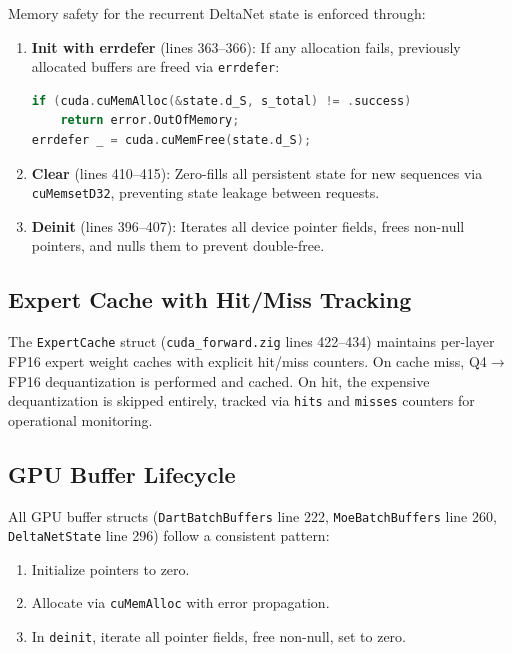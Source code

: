 \documentclass[11pt]{article}
\begin{document}
Memory safety for the recurrent DeltaNet state is enforced through:

\begin{enumerate}
  \item \textbf{Init with errdefer} (lines 363--366): If any allocation fails,
        previously allocated buffers are freed via \texttt{errdefer}:
\begin{lstlisting}[language=C,caption={errdefer safety (cuda\_forward.zig:363--366)}]
if (cuda.cuMemAlloc(&state.d_S, s_total) != .success)
    return error.OutOfMemory;
errdefer _ = cuda.cuMemFree(state.d_S);
\end{lstlisting}

  \item \textbf{Clear} (lines 410--415): Zero-fills all persistent state for
        new sequences via \texttt{cuMemsetD32}, preventing state leakage between
        requests.

  \item \textbf{Deinit} (lines 396--407): Iterates all device pointer fields,
        frees non-null pointers, and nulls them to prevent double-free.
\end{enumerate}

\subsection{Expert Cache with Hit/Miss Tracking}

The \texttt{ExpertCache} struct (\texttt{cuda\_forward.zig} lines 422--434)
maintains per-layer FP16 expert weight caches with explicit hit/miss counters.
On cache miss, Q4$\to$FP16 dequantization is performed and cached. On hit,
the expensive dequantization is skipped entirely, tracked via
\texttt{hits} and \texttt{misses} counters for operational monitoring.

\subsection{GPU Buffer Lifecycle}

All GPU buffer structs (\texttt{DartBatchBuffers} line 222,
\texttt{MoeBatchBuffers} line 260, \texttt{DeltaNetState} line 296) follow
a consistent pattern:
\begin{enumerate}
  \item Initialize pointers to zero.
  \item Allocate via \texttt{cuMemAlloc} with error propagation.
  \item In \texttt{deinit}, iterate all pointer fields, free non-null,
        set to zero.
\end{enumerate}
\end{document}
